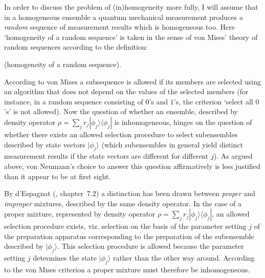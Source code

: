 \documentclass[12pt]{article}
\begin{document}
In order to discuss the problem of (in)homogeneity more fully, I
will assume that in a homogeneous ensemble a quantum mechanical
measurement produces a {\em random} sequence of measurement
results which is homogeneous too. Here `homogeneity of a random
sequence' is taken in the sense of von Mises' theory of random
sequences \cite{Mises} according to the definition:

 (homogeneity of a random sequence).

\noindent According to von Mises a subsequence is allowed if its
members are selected using an algorithm that does not depend on
the values of the selected members (for instance, in a random
sequence consisting of $0$'s and $1$'s, the criterion `select all
$0$'s' is not allowed). Now the question of whether an ensemble,
described by density operator $\rho= \sum_j r_j |\phi_j
\rangle\langle \phi_j|$ is inhomogeneous, hinges on the question
of whether there exists an allowed selection procedure to select
subensembles described by state vectors $|\phi_j \rangle$ (which
subensembles in general yield distinct measurement results if the
state vectors are different for different $j$). As argued above,
von Neumann's choice to answer this question affirmatively is less
justified than it appear to be at first sight.

By d'Espagnat (\cite{EspCFQM}, chapter~7.2) a distinction has been
drawn between {\em proper} and {\em improper} mixtures, described
by the same density operator. In the case of a proper mixture,
represented by density operator $\rho= \sum_j r_j |\phi_j \rangle
\langle \phi_j|$, an allowed selection procedure exists, viz.
selection on the basis of the parameter setting $j$ of the
preparation apparatus corresponding to the preparation of the
subensemble described by $|\phi_j\rangle$. This selection
procedure is allowed because the parameter setting $j$ determines
the state $|\phi_j \rangle$ rather than the other way around.
According to the von Mises criterion a proper mixture must
therefore be inhomogeneous.
\end{document}
